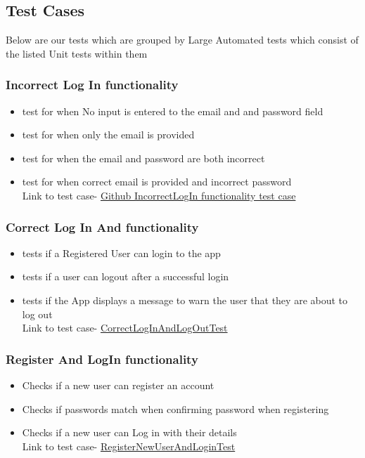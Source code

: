 \documentclass[english]{article}
\begin{document}
	\subsection {Test Cases}
	Below are our tests which are grouped by Large Automated tests which consist of the listed Unit tests within them
		\subsubsection{Incorrect Log In functionality}
		\begin{itemize} 
			\item test for when No input is entered to the email and and password field
			\item test for when only the email is provided 
			\item test for when the email and password  are both incorrect
			\item test for when correct email is provided and incorrect password\\


			Link to test case-
			\href{https://github.com/XoloKDandashe/Alpha-Tech/blob/master/Code/NFCBusinessCardLocal2/app/src/androidTest/java/com/example/www/nfcbusinesscardlocal/LogInIncorrectDetails.java}{Github IncorrectLogIn functionality test case}

		\end{itemize}
		\subsubsection{Correct Log In And functionality}
		\begin{itemize} 
			\item tests if a Registered User can login to the app
			\item tests if a user can logout after a successful login
			\item tests if the App displays a message to warn the user that they are about to log out
			\\	Link to test case-
			\href{https://github.com/XoloKDandashe/Alpha-Tech/blob/master/Code/NFCBusinessCardLocal2/app/src/androidTest/java/com/example/www/nfcbusinesscardlocal/CorrectLogInandLogOutTest.java}{CorrectLogInAndLogOutTest}
		\end{itemize}

		\subsubsection{Register And LogIn functionality}
		\begin{itemize} 
			\item Checks if a new user can register an account
			\item Checks if passwords match when confirming password when registering
			\item Checks if a new user can Log in with their details 
			\\	Link to test case-
	\href{https://github.com/XoloKDandashe/Alpha-Tech/blob/master/Code/NFCBusinessCardLocal2/app/src/androidTest/java/com/example/www/nfcbusinesscardlocal/RegisterNewUserAndLogInTest.java}{RegisterNewUserAndLoginTest}

			
		\end{itemize}
\end{document}
